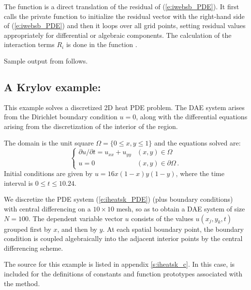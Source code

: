 The function  is a direct translation of the residual of
(\ref{e:iwebsb_PDE}).  It first calls the private function  to
initialize the residual vector with the right-hand side of (\ref{e:iwebsb_PDE})
and then it loops over all grid points, setting residual values appropriately for 
differential or algebraic components. The calculation of the interaction terms
$R_i$ is done in the function .


Sample output from  follows.


\subsection{A Krylov example: }\label{ss:iheatsk}

This example solves a discretized 2D heat PDE problem. The DAE system
arises from the Dirichlet boundary condition $u = 0$, along with the 
differential equations arising from the discretization of the interior 
of the region. 

The domain is the unit square $\Omega = \{ 0 \le x,y \le 1 \}$ and the
equations solved are:
\begin{equation}\label{e:iheatsk_PDE}
\begin{cases}
  \partial u / \partial t = u_{xx} + u_{yy}  & (x,y) \in \Omega \\
  u = 0 & (x,y) \in \partial\Omega\, .
\end{cases}
\end{equation}
Initial conditions are given by $u = 16x(1-x)y(1-y)$, where the time interval is 
$0 \leq t \leq 10.24$.

We discretize the PDE system (\ref{e:iheatsk_PDE}) (plus boundary conditions)
with central differencing on a $10 \times 10$ mesh, so as to obtain a
DAE system of size $N = 100$.  The dependent variable vector $u$
consists of the values $u(x_j,y_k,t)$ grouped first by $x$, and then
by $y$.  At each spatial boundary point, the boundary condition is coupled
algebraically into the adjacent interior points by the central differencing
scheme. 

The source for this example is listed in appendix \ref{s:iheatsk_c}.
In this case,  is included for the definitions of
constants and function prototypes associated with the {\spgmr} method.

